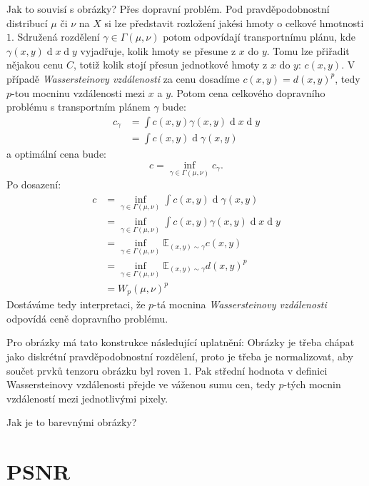 \documentclass[czech]{article}
\begin{document}
Jak to souvisí s obrázky?
Přes dopravní problém.
Pod pravděpodobnostní distribucí $\mu$ či $\nu$ na $X$ si lze představit rozložení jakési hmoty
o celkové hmotnosti $1$.
Sdružená rozdělení $\gamma \in \Gamma(\mu, \nu)$ potom odpovídají transportnímu plánu,
kde $\gamma(x, y) \operatorname{d}x \operatorname{d}y$
vyjadřuje, kolik hmoty se přesune z $x$ do $y$.
Tomu lze přiřadit nějakou cenu $C$,
totiž kolik stojí přesun jednotkové hmoty z $x$ do $y$: $c(x, y)$.
V případě \emph{Wassersteinovy vzdálenosti}
za cenu dosadíme $c(x, y) = d(x, y)^p$,
tedy $p$-tou mocninu vzdálenosti mezi $x$ a $y$.
Potom cena celkového dopravního problému s transportním plánem $\gamma$ bude:
\begin{align}
    c_\gamma &= \int c(x, y) \gamma(x, y) \operatorname{d}x \operatorname{d}y \\
    &= \int c(x, y) \operatorname{d} \gamma(x, y)
\end{align}
a optimální cena bude:
\begin{equation}
    c = \inf_{\gamma \in \Gamma(\mu, \nu)} c_\gamma.
\end{equation}
Po dosazení:
\begin{align}
    c &= \inf_{\gamma \in \Gamma(\mu, \nu)} \int c(x, y) \operatorname{d} \gamma(x, y) \\
    &= \inf_{\gamma \in \Gamma(\mu, \nu)} \int c(x, y) \gamma(x, y) \operatorname{d}x \operatorname{d}y \\
    &= \inf_{\gamma \in \Gamma(\mu, \nu)} \mathbb{E}_{(x, y) \sim \gamma} c(x, y) \\
    &= \inf_{\gamma \in \Gamma(\mu, \nu)} \mathbb{E}_{(x, y) \sim \gamma} d(x, y)^p \\
    &= W_p (\mu, \nu)^p
\end{align}
Dostáváme tedy interpretaci, že $p$-tá mocnina \emph{Wassersteinovy vzdálenosti}
odpovídá ceně dopravního problému.

Pro obrázky má tato konstrukce následující uplatnění:
Obrázky je třeba chápat jako diskrétní pravděpodobnostní rozdělení,
proto je třeba je normalizovat,
aby součet prvků tenzoru obrázku byl roven $1$.
Pak střední hodnota v definici Wassersteinovy vzdálenosti přejde ve váženou sumu cen,
tedy $p$-tých mocnin vzdáleností mezi jednotlivými pixely.

Jak je to barevnými obrázky?

\section{PSNR}
\end{document}
